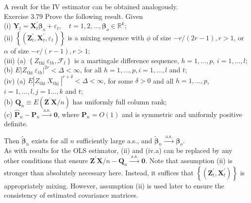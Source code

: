 \documentclass[10pt]{article}
\begin{document}
A result for the IV estimator can be obtained analogously.\\
Exercise 3.79 Prove the following result. Given\\
(i) $\mathbf{Y}_{t}=\mathbf{X}_{t}^{\prime} \boldsymbol{\beta}_{o}+\varepsilon_{t}, \quad t=1,2, \ldots, \boldsymbol{\beta}_{o} \in \mathbb{R}^{k}$;\\
(ii) $\left\{\left(\mathbf{Z}_{t}^{\prime}, \mathbf{X}_{t}^{\prime}, \varepsilon_{t}\right)\right\}$ is a mixing sequence with $\phi$ of size $-r /(2 r-1), r>1$, or $\alpha$ of size $-r /(r-1), r>1$;\\
(iii) (a) $\left\{Z_{\text {thi }} \varepsilon_{t h}, \mathcal{F}_{t}\right\}$ is a martingale difference sequence, $h=1, \ldots, p$, $i=1, \ldots, l ;$\\
(b) $E\left|Z_{\text {thi }} \varepsilon_{t h}\right|^{2 r}<\Delta<\infty$, for all $h=1, \ldots, p, i=1, \ldots, l$ and $t$;\\
(iv) (a) $E\left|Z_{\text {thi }} X_{\text {thj }}\right|^{r+\delta}<\Delta<\infty$, for some $\delta>0$ and all $h=1, \ldots, p$, $i=1, \ldots, l, j=1 \ldots, k$ and $t$;\\
(b) $\mathbf{Q}_{n} \equiv E\left(\mathbf{Z}^{\prime} \mathbf{X} / n\right)$ has uniformly full column rank;\\
(c) $\hat{\mathbf{P}}_{n}-\mathbf{P}_{n} \xrightarrow{\text { a.s. }} \mathbf{0}$, where $\mathbf{P}_{n}=O(1)$ and is symmetric and uniformly positive definite.

Then $\tilde{\boldsymbol{\beta}}_{n}$ exists for all $n$ sufficiently large a.s., and $\tilde{\boldsymbol{\beta}}_{n} \xrightarrow{\text { a.s. }} \boldsymbol{\beta}_{o}$.\\
As with results for the OLS estimator, (ii) and (iv.a) can be replaced by any other conditions that ensure $\mathbf{Z}^{\prime} \mathbf{X} / n-\mathbf{Q}_{n} \xrightarrow{\text { a.s. }} \mathbf{0}$. Note that assumption (ii) is stronger than absolutely necessary here. Instead, it suffices that $\left\{\left(\mathbf{Z}_{t}^{\prime}, \mathbf{X}_{t}^{\prime}\right)\right\}$ is appropriately mixing. However, assumption (ii) is used later to ensure the consistency of estimated covariance matrices.
\end{document}
